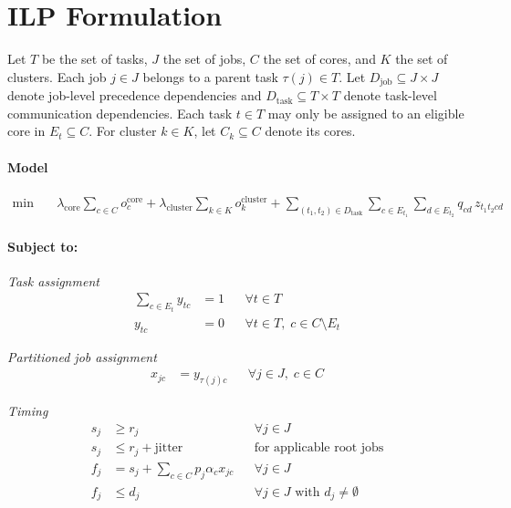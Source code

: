 \documentclass[11pt,a4paper]{article}
\begin{document}
\section{ILP Formulation}

Let $T$ be the set of tasks, $J$ the set of jobs, $C$ the set of cores, and $K$ the set of clusters.
Each job $j \in J$ belongs to a parent task $\tau(j) \in T$.
Let $D_{\mathrm{job}} \subseteq J \times J$ denote job-level precedence dependencies and
$D_{\mathrm{task}} \subseteq T \times T$ denote task-level communication dependencies.
Each task $t \in T$ may only be assigned to an eligible core in $E_t \subseteq C$.
For cluster $k \in K$, let $C_k \subseteq C$ denote its cores.

\paragraph{Model}
\begin{align}
\min \quad
&
\lambda_{\mathrm{core}} \sum_{c \in C} o_c^{\mathrm{core}}
+
\lambda_{\mathrm{cluster}} \sum_{k \in K} o_k^{\mathrm{cluster}}
+
\sum_{(t_1,t_2)\in D_{\mathrm{task}}}
\sum_{c \in E_{t_1}}
\sum_{d \in E_{t_2}}
q_{cd}\, z_{t_1t_2cd}
\end{align}

\paragraph{Subject to:\\}

\textit{Task assignment}
\begin{align}
\sum_{c \in E_t} y_{tc} &= 1
&& \forall t \in T \\
y_{tc} &= 0
&& \forall t \in T,\; c \in C \setminus E_t
\end{align}

\textit{Partitioned job assignment}
\begin{align}
x_{jc} &= y_{\tau(j)c}
&& \forall j \in J,\; c \in C
\end{align}

\textit{Timing}
\begin{align}
s_j &\ge r_j
&& \forall j \in J \\
s_j &\le r_j + \mathrm{jitter}
&& \text{for applicable root jobs} \\
f_j &= s_j + \sum_{c \in C} p_j \alpha_c x_{jc}
&& \forall j \in J \\
f_j &\le d_j
&& \forall j \in J \text{ with } d_j \neq \emptyset
\end{align}
\end{document}
